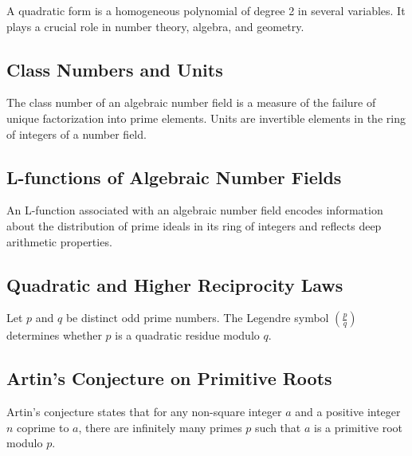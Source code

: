 \documentclass{article}
\begin{document}
\begin{definition}
A quadratic form is a homogeneous polynomial of degree 2 in several variables. It plays a crucial role in number theory, algebra, and geometry.
\end{definition}

\subsection{Class Numbers and Units}

\begin{definition}
The class number of an algebraic number field is a measure of the failure of unique factorization into prime elements. Units are invertible elements in the ring of integers of a number field.
\end{definition}

\subsection{L-functions of Algebraic Number Fields}

\begin{definition}
An L-function associated with an algebraic number field encodes information about the distribution of prime ideals in its ring of integers and reflects deep arithmetic properties.
\end{definition}

\subsection{Quadratic and Higher Reciprocity Laws}

\begin{theorem}
Let $p$ and $q$ be distinct odd prime numbers. The Legendre symbol $\left(\frac{p}{q}\right)$ determines whether $p$ is a quadratic residue modulo $q$.
\end{theorem}

\subsection{Artin's Conjecture on Primitive Roots}

\begin{theorem}
Artin's conjecture states that for any non-square integer $a$ and a positive integer $n$ coprime to $a$, there are infinitely many primes $p$ such that $a$ is a primitive root modulo $p$.
\end{theorem}
\end{document}
